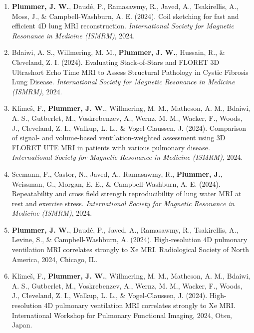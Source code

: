 \documentclass[12pt,]{scrartcl}
\begin{document}
\begin{enumerate}
  \leftskip-0.13in %

  \item \textbf{Plummer, J. W.}, Daudé, P., Ramasawmy, R., Javed, A., Tsakirellis, A., Moss, J., \& Campbell-Washburn, A. E. (2024). Coil sketching for fast and efficient 4D lung MRI reconstruction. \textit{International Society for Magnetic Resonance in Medicine (ISMRM)}, 2024.



    \item Bdaiwi, A. S., Willmering, M. M., \textbf{Plummer, J. W.}, Hussain, R., \& Cleveland, Z. I. (2024). Evaluating Stack-of-Stars and FLORET 3D Ultrashort Echo Time MRI to Assess Structural Pathology in Cystic Fibrosis Lung Disease. \textit{International Society for Magnetic Resonance in Medicine (ISMRM)}, 2024.
    
    \item Klimeš, F., \textbf{Plummer, J. W.}, Willmering, M. M., Matheson, A. M., Bdaiwi, A. S., Gutberlet, M., Voskrebenzev, A., Wernz, M. M., Wacker, F., Woods, J., Cleveland, Z. I., Walkup, L. L., \& Vogel-Claussen, J. (2024). Comparison of signal- and volume-based ventilation-weighted assessment using 3D FLORET UTE MRI in patients with various pulmonary disease. \textit{International Society for Magnetic Resonance in Medicine (ISMRM)}, 2024.
    
    \item Seemann, F., Castor, N., Javed, A., Ramasawmy, R., \textbf{Plummer, J.}, Weissman, G., Morgan, E. E., \& Campbell-Washburn, A. E. (2024). Repeatability and cross field strength reproducibility of lung water MRI at rest and exercise stress. \textit{International Society for Magnetic Resonance in Medicine (ISMRM)}, 2024.
    
    
  \item \textbf{Plummer, J. W.}, Daudé, P., Javed, A., Ramasawmy, R., Tsakirellis, A., Levine, S., \& Campbell-Washburn, A. (2024). High-resolution 4D pulmonary ventilation MRI correlates strongly to Xe MRI. Radiological Society of North America, 2024, Chicago, IL.

  \item Klimeš, F., \textbf{Plummer, J. W.}, Willmering, M. M., Matheson, A. M., Bdaiwi, A. S., Gutberlet, M., Voskrebenzev, A., Wernz, M. M., Wacker, F., Woods, J., Cleveland, Z. I., Walkup, L. L., \& Vogel-Claussen, J. (2024). High-resolution 4D pulmonary ventilation MRI correlates strongly to Xe MRI. International Workshop for Pulmonary Functional Imaging, 2024, Otsu, Japan.


\end{enumerate}
\end{document}
